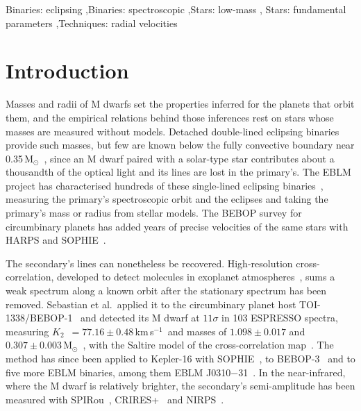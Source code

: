 \documentclass[3p,11pt]{elsarticle}
\newcommand{\kms}{km\,s$^{-1}$}
\newcommand{\Msun}{M$_\odot$}
\newcommand{\Ktwo}{$K_2$}
\begin{document}
\begin{frontmatter}
\begin{keyword}
Binaries: eclipsing \sep Binaries: spectroscopic \sep Stars: low-mass \sep
Stars: fundamental parameters \sep Techniques: radial velocities
\end{keyword}

\end{frontmatter}

\section{Introduction}\label{sec:intro}

Masses and radii of M dwarfs set the properties inferred for the planets that orbit them, and
the empirical relations behind those inferences rest on stars whose masses are measured
without models. Detached double-lined eclipsing binaries provide such masses, but few are
known below the fully convective boundary near 0.35\,\Msun~\cite{Torres2010,Southworth2015},
since an M dwarf paired with a solar-type star contributes about a thousandth of the optical
light and its lines are lost in the primary's. The EBLM project has characterised hundreds of
these single-lined eclipsing binaries~\cite{Triaud2013,Triaud2017,Maxted2023}, measuring the
primary's spectroscopic orbit and the eclipses and taking the primary's mass or radius from
stellar models. The BEBOP survey for circumbinary planets has added years of precise velocities
of the same stars with HARPS and SOPHIE~\cite{Martin2019,Standing2022,Triaud2022}.

The secondary's lines can nonetheless be recovered. High-resolution cross-correlation, developed
to detect molecules in exoplanet atmospheres~\cite{Snellen2010,Brogi2012}, sums a weak spectrum
along a known orbit after the stationary spectrum has been removed. Sebastian et al.\ applied it
to the circumbinary planet host TOI-1338/BEBOP-1~\cite{Kostov2020,Standing2023} and detected its
M dwarf at $11\sigma$ in 103 ESPRESSO spectra, measuring \Ktwo\ $= 77.16 \pm 0.48$\,\kms\ and
masses of $1.098 \pm 0.017$ and $0.307 \pm 0.003$\,\Msun~\cite{Sebastian2024b}, with the
Saltire model of the cross-correlation map~\cite{Sebastian2024a}. The method has since been
applied to Kepler-16 with SOPHIE~\cite{Sebastian2025b}, to BEBOP-3~\cite{Baycroft2025} and to
five more EBLM binaries, among them EBLM J0310$-$31~\cite{Stevenson2026}. In the near-infrared,
where the M dwarf is relatively brighter, the secondary's semi-amplitude has been measured with
SPIRou~\cite{Maxted2022}, CRIRES+~\cite{Sebastian2025a} and NIRPS~\cite{Adshead2026,Hahlin2026}.
\end{document}
